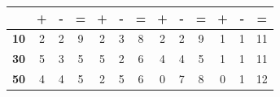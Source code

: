 \documentclass[12pt,a4paper]{report}
\begin{document}
{{{{{{{\begin{table}[h]
\begin{tabular}{|c|c|c|c|c|c|c|c|c|c|c|c|c|}
         & {\bf\hspace{3mm}+\hspace{3mm}}       & {\bf\hspace{4mm}-\hspace{4mm}}      & {\bf\hspace{1mm}=\hspace{1mm}}      & {\bf\hspace{1mm}+\hspace{1mm}}       & {\bf\hspace{1mm}-\hspace{1mm}}       & {\bf\hspace{1mm}=}       & {\bf\hspace{2mm}+\hspace{2mm}}        & {\bf\hspace{3mm}-\hspace{3mm}}        & {\bf\hspace{1mm}=\hspace{1mm}}       & {\bf\hspace{1mm}+\hspace{1mm}}   & {\bf\hspace{1mm}-\hspace{1mm}}   & {\bf\hspace{1mm}=\hspace{1mm}}  \\ \hline
{\bf 10} & 2             & 2            & 9            & 2             & 3             & 8             & 2              & 2              & 9             & 1         & 1         & 11        \\ \hline
{\bf 30} & 5             & 3            & 5            & 5             & 2             & 6             & 4              & 4              & 5             & 1         & 1         & 11        \\ \hline
{\bf 50} & 4             & 4            & 5            & 2             & 5             & 6             & 0              & 7              & 8             & 0         & 1         &  12        \\ \hline
\end{tabular}
\end{table}


}}}}}}}
\end{document}
